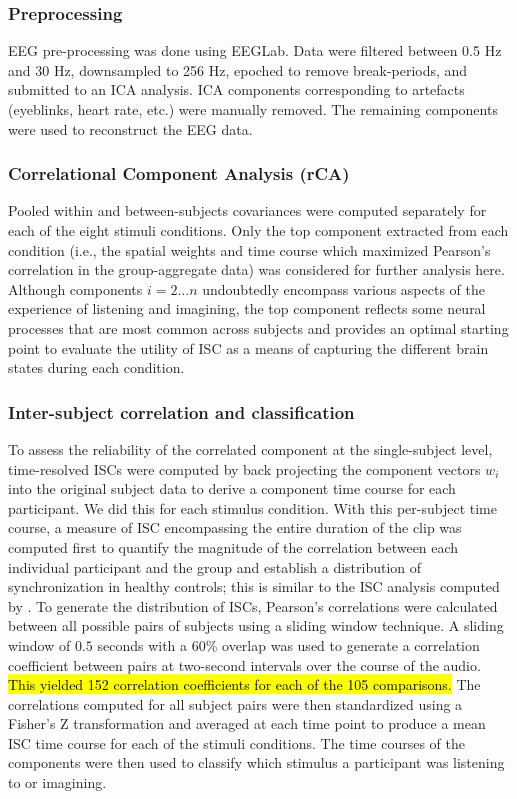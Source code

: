 \documentclass[utf8]{frontiersSCNS} %
\begin{document}
\subsubsection{Preprocessing}
\ac{EEG} pre-processing was done using EEGLab. 
Data were filtered between 0.5 Hz and 30 Hz, downsampled to 256 Hz, epoched to remove break-periods, and submitted to an \ac{ICA} analysis.
\ac{ICA} components corresponding to artefacts (eyeblinks, heart rate, etc.) were manually removed.
The remaining components were used to reconstruct the EEG data.
\subsubsection{Correlational Component Analysis (rCA)}
Pooled within and between-subjects covariances were computed separately for each of the eight stimuli conditions. 
Only the top component extracted from each condition (i.e., the spatial weights and time course which maximized Pearson's correlation in the group-aggregate data) was considered for further analysis here. 
Although components $i = 2 ... n$ undoubtedly encompass various aspects of the experience of listening and imagining, the top component reflects some neural processes that are most common across subjects and provides an optimal starting point to evaluate the utility of ISC as a means of capturing the different brain states during each condition. 
\subsubsection{Inter-subject correlation and classification}
To assess the reliability of the correlated component at the single-subject level, time-resolved ISCs were computed by back projecting the component vectors $w_{i}$ into the original subject data to derive a component time course for each participant. 
We did this for each stimulus condition. 
With this per-subject time course, a measure of ISC encompassing the entire duration of the clip was computed first to quantify the magnitude of the correlation between each individual participant and the group and establish a distribution of synchronization in healthy controls; this is similar to the ISC analysis computed by \cite{Naci2015}. 
To generate the distribution of ISCs, Pearson's correlations were calculated between all possible pairs of subjects using a sliding window technique. A sliding window of $0.5$ seconds with a 60\% overlap was used to generate a correlation coefficient between pairs at two-second intervals over the course of the audio. 
\hl{This yielded 152 correlation coefficients for each of the 105 comparisons.}
The correlations computed for all subject pairs were then standardized using a Fisher's Z transformation and averaged at each time point to produce a mean ISC time course for each of the stimuli conditions. 
The time courses of the components were then used to classify which stimulus a participant was listening to or imagining. 
\end{document}

